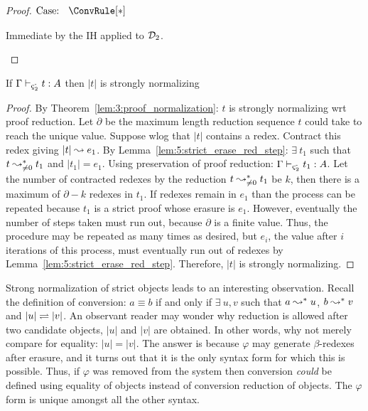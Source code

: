 \begin{proof}
    $\text{Case: }\begin{array}{c} \ConvRule[*] \end{array}$
    \begin{proofcase}
        Immediate by the IH applied to $\mathcal{D}_{2}$.
    \end{proofcase}

\end{proof}

\begin{theorem}
    \label{lem:5:strict_object_sn}
    If $\Gamma \vdash_{\ced^\text{-}} t : A$ then $|t|$ is strongly normalizing
\end{theorem}
\begin{proof}
    By Theorem~\ref{lem:3:proof_normalization}: $t$ is strongly normalizing wrt proof reduction.
    Let $\partial$ be the maximum length reduction sequence $t$ could take to reach the unique value.
    Suppose wlog that $|t|$ contains a redex.
    Contract this redex giving $|t| \leadsto e_1$.
    By Lemma~\ref{lem:5:strict_erase_red_step}: $\exists\ t_1$ such that $t \leadsto^*_{\neq 0} t_1$ and $|t_1| = e_1$.
    Using preservation of proof reduction: $\Gamma \vdash_{\ced^\text{-}} t_1 : A$.
    Let the number of contracted redexes by the reduction $t \leadsto^*_{\neq 0} t_1$ be $k$, then there is a maximum of $\partial - k$ redexes in $t_1$.
    If redexes remain in $e_1$ than the process can be repeated because $t_1$ is a strict proof whose erasure is $e_1$.
    However, eventually the number of steps taken must run out, because $\partial$ is a finite value.
    Thus, the procedure may be repeated as many times as desired, but $e_i$, the value after $i$ iterations of this process, must eventually run out of redexes by Lemma~\ref{lem:5:strict_erase_red_step}.
    Therefore, $|t|$ is strongly normalizing.
\end{proof}

Strong normalization of strict objects leads to an interesting observation.
Recall the definition of conversion: $a \equiv b$ if and only if $\exists\ u, v$ such that $a \leadsto^* u$, $b \leadsto^* v$ and $|u| \rightleftharpoons |v|$.
An observant reader may wonder why reduction is allowed after two candidate objects, $|u|$ and $|v|$ are obtained.
In other words, why not merely compare for equality: $|u| = |v|$.
The answer is because $\varphi$ may generate $\beta$-redexes after erasure, and it turns out that it is the only syntax form for which this is possible.
Thus, if $\varphi$ was removed from the system then conversion \textit{could} be defined using equality of objects instead of conversion reduction of objects.
The $\varphi$ form is unique amongst all the other syntax.

